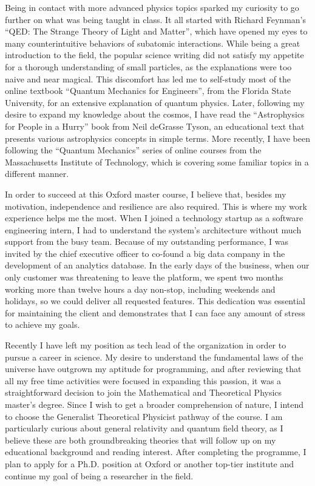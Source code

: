 \documentclass[10pt]{article}
\newcommand*{\NEWLINE}{\vspace{0.75em}}
\begin{document}
Being in contact with more advanced physics topics sparked my curiosity to go further on what was being taught in class. It all started with Richard Feynman's ``QED: The Strange Theory of Light and Matter'', which have opened my eyes to many counterintuitive behaviors of subatomic interactions. While being a great introduction to the field, the popular science writing did not satisfy my appetite for a thorough understanding of small particles, as the explanations were too naive and near magical. This discomfort has led me to self-study most of the online textbook ``Quantum Mechanics for Engineers'', from the Florida State University, for an extensive explanation of quantum physics. Later, following my desire to expand my knowledge about the cosmos, I have read the ``Astrophysics for People in a Hurry'' book from Neil deGrasse Tyson, an educational text that presents various astrophysics concepts in simple terms. More recently, I have been following the ``Quantum Mechanics'' series of online courses from the Massachusetts Institute of Technology, which is covering some familiar topics in a different manner.
\NEWLINE{}

In order to succeed at this Oxford master course, I believe that, besides my motivation, independence and resilience are also required. This is where my work experience helps me the most. When I joined a technology startup as a software engineering intern, I had to understand the system's architecture without much support from the busy team. Because of my outstanding performance, I was invited by the chief executive officer to co-found a big data company in the development of an analytics database. In the early days of the business, when our only customer was threatening to leave the platform, we spent two months working more than twelve hours a day non-stop, including weekends and holidays, so we could deliver all requested features. This dedication was essential for maintaining the client and demonstrates that I can face any amount of stress to achieve my goals. \NEWLINE{}

Recently I have left my position as tech lead of the organization in order to pursue a career in science. My desire to understand the fundamental laws of the universe have outgrown my aptitude for programming, and after reviewing that all my free time activities were focused in expanding this passion, it was a straightforward decision to join the Mathematical and Theoretical Physics master's degree. Since I wish to get a broader comprehension of nature, I intend to choose the Generalist Theoretical Physicist pathway of the course. I am particularly curious about general relativity and quantum field theory, as I believe these are both groundbreaking theories that will follow up on my educational background and reading interest. After completing the programme, I plan to apply for a Ph.D. position at Oxford or another top-tier institute and continue my goal of being a researcher in the field.
\end{document}
